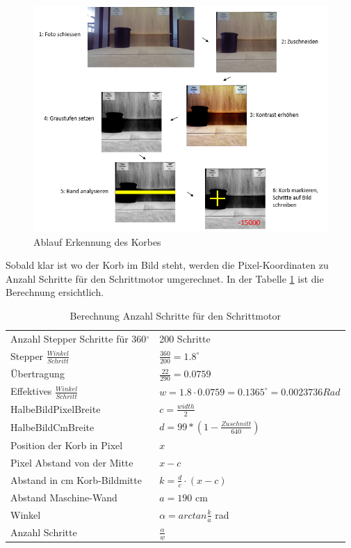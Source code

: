 \begin{figure}[h!]
	\centering
	\includegraphics[width=0.8\linewidth]{../../fig/algorithmus-korb-erkennung.png}
	\caption{Ablauf Erkennung des Korbes}
	\label{fig:ablauf-ortung-des-korbes-algorithmus}
\end{figure}

\newpage
\noindent
Sobald klar ist wo der Korb im Bild steht, werden die Pixel-Koordinaten zu Anzahl Schritte für den Schrittmotor umgerechnet. In der Tabelle \ref{tab:berechnung-steps} ist die Berechnung ersichtlich. 

\begin{table}[h!]
	\renewcommand{\arraystretch}{1.5}
	\centering
	\begin{tabular}{l l}
		Anzahl Stepper Schritte für 360$^\circ$ & 200 Schritte \\
		Stepper $\frac{Winkel}{Schritt}$ & $\frac{360}{200} = 1.8^\circ$ \\
		Übertragung & $\frac{22}{290} = 0.0759$ \\
		Effektives $\frac{Winkel}{Schritt}$ & $w = 1.8 \cdot 0.0759 = 0.1365^\circ = 0.0023736 Rad$ \\
		HalbeBildPixelBreite & $c = \frac{width}{2}$ \\
		HalbeBildCmBreite & $d = 99*(1-\frac{Zuschnitt}{640})$ \\
		Position der Korb in Pixel & $x$ \\
		Pixel Abstand von der Mitte & $x - c$ \\
		Abstand in cm Korb-Bildmitte & $k = \frac{d}{c} \cdot (x-c)$ \\
		Abstand Maschine-Wand & $a = 190$ cm \\
		Winkel & $\alpha = arctan\frac{k}{a}$ rad \\
		Anzahl Schritte & $\frac{\alpha}{w}$ \\
	\end{tabular}
	\caption{Berechnung Anzahl Schritte für den Schrittmotor}
	\label{tab:berechnung-steps}
\end{table}


